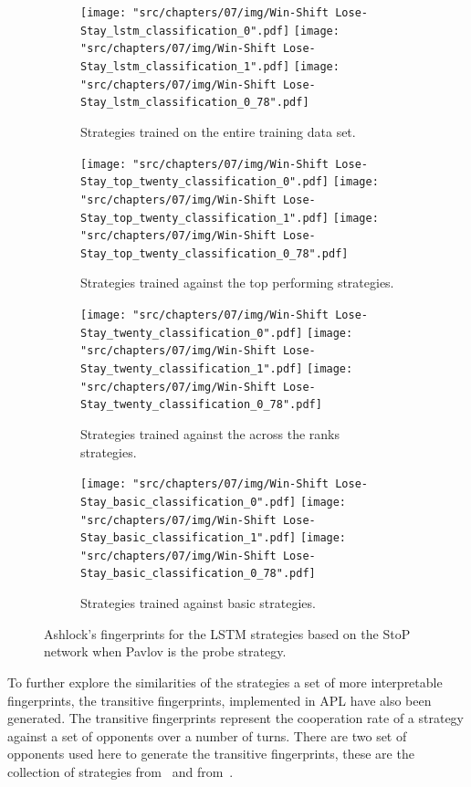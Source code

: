 \begin{figure}[!htbp]
    \begin{subfigure}{\textwidth}
        \texttt{[image: "src/chapters/07/img/Win-Shift Lose-Stay\_lstm\_classification\_0".pdf]}
        \texttt{[image: "src/chapters/07/img/Win-Shift Lose-Stay\_lstm\_classification\_1".pdf]}
        \texttt{[image: "src/chapters/07/img/Win-Shift Lose-Stay\_lstm\_classification\_0\_78".pdf]}
        \caption{Strategies trained on the entire training data set.}
    \end{subfigure}
    \begin{subfigure}{\textwidth}
        \texttt{[image: "src/chapters/07/img/Win-Shift Lose-Stay\_top\_twenty\_classification\_0".pdf]}
        \texttt{[image: "src/chapters/07/img/Win-Shift Lose-Stay\_top\_twenty\_classification\_1".pdf]}
        \texttt{[image: "src/chapters/07/img/Win-Shift Lose-Stay\_top\_twenty\_classification\_0\_78".pdf]}
        \caption{Strategies trained against the top performing strategies.}
    \end{subfigure}
    \begin{subfigure}{\textwidth}
        \texttt{[image: "src/chapters/07/img/Win-Shift Lose-Stay\_twenty\_classification\_0".pdf]}
        \texttt{[image: "src/chapters/07/img/Win-Shift Lose-Stay\_twenty\_classification\_1".pdf]}
        \texttt{[image: "src/chapters/07/img/Win-Shift Lose-Stay\_twenty\_classification\_0\_78".pdf]}
        \caption{Strategies trained against the across the ranks strategies.}
    \end{subfigure}
    \begin{subfigure}{\textwidth}
        \texttt{[image: "src/chapters/07/img/Win-Shift Lose-Stay\_basic\_classification\_0".pdf]}
        \texttt{[image: "src/chapters/07/img/Win-Shift Lose-Stay\_basic\_classification\_1".pdf]}
        \texttt{[image: "src/chapters/07/img/Win-Shift Lose-Stay\_basic\_classification\_0\_78".pdf]}
        \caption{Strategies trained against basic strategies.}
    \end{subfigure}
    \caption{Ashlock's fingerprints for the LSTM strategies based on the StoP
    network when Pavlov is the probe strategy.}\label{fig:ashlock_fingerprints_pavlov_s_to_p}
\end{figure}

To further explore the similarities of the strategies a set of more
interpretable fingerprints, the transitive fingerprints, implemented in APL have
also been generated. The transitive fingerprints represent the cooperation rate
of a strategy against a set of opponents over a number of turns. There are two
set of opponents used here to generate the transitive fingerprints, these are
the collection of strategies from~\cite{Stewart2012} and
from~\cite{Beaufils1997}.

